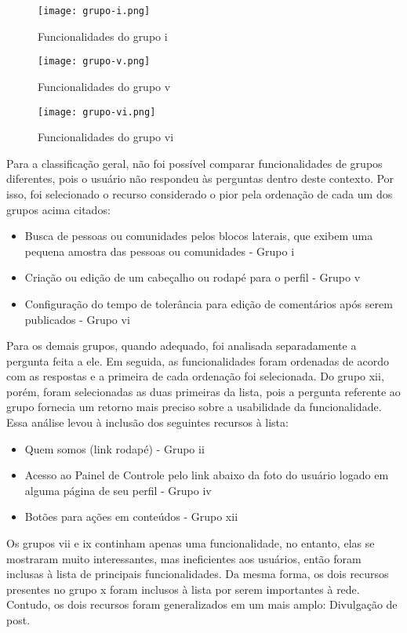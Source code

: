 \begin{figure}[!h]
  \centering
  \texttt{[image: grupo-i.png]} 
  \caption{Funcionalidades do grupo i}
  \label{fig:grupo-i} 
\end{figure}

    
\begin{figure}[!h]
  \centering
  \texttt{[image: grupo-v.png]} 
  \caption{Funcionalidades do grupo v}
  \label{fig:grupo-v} 
\end{figure}

    
\begin{figure}[!h]
  \centering
  \texttt{[image: grupo-vi.png]} 
  \caption{Funcionalidades do grupo vi}
  \label{fig:grupo-vi} 
\end{figure}


    Para a classificação geral, não foi possível comparar funcionalidades de grupos diferentes, pois o usuário não respondeu às perguntas dentro deste contexto. Por isso, foi selecionado o recurso considerado o pior pela ordenação de cada um dos grupos acima citados: 
    \begin{itemize}
    \item Busca de pessoas ou comunidades pelos blocos laterais, que exibem uma pequena amostra das pessoas ou comunidades - Grupo i
    \item Criação ou edição de um cabeçalho ou rodapé para o perfil - Grupo v
    \item Configuração do tempo de tolerância para edição de comentários após serem publicados - Grupo vi
    \end{itemize}
    Para os demais grupos, quando adequado, foi analisada separadamente a pergunta feita a ele. Em seguida, as funcionalidades foram ordenadas de acordo com as respostas e a primeira de cada ordenação foi selecionada. Do grupo xii, porém, foram selecionadas as duas primeiras da lista, pois a pergunta referente ao grupo fornecia um retorno mais preciso sobre a usabilidade da funcionalidade. Essa análise levou à inclusão dos seguintes recursos à lista:
    \begin{itemize}
    \item Quem somos (link rodapé) - Grupo ii
    \item Acesso ao Painel de Controle pelo link abaixo da foto do usuário logado em alguma página de seu perfil - Grupo iv
    \item Botões para ações em conteúdos - Grupo xii
    \end{itemize}
    Os grupos vii e ix continham apenas uma funcionalidade, no entanto, elas se mostraram muito interessantes, mas ineficientes aos usuários, então foram inclusas à lista de principais funcionalidades. Da mesma forma, os dois recursos presentes no grupo x foram inclusos à lista por serem importantes à rede. Contudo, os dois recursos foram generalizados em um mais amplo: Divulgação de post. 
    
